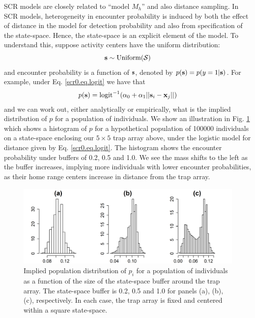 SCR models are closely related to  ``model
$M_h$'' and also distance sampling.  In SCR models,
heterogeneity in encounter probability is induced by both the effect
of distance in the model for detection probability and also from
specification of the state-space. Hence, the state-space  is an
explicit element of the model.
To understand this, suppose activity centers have the uniform distribution:
\[
{\bf s} \sim \mbox{Uniform}({\cal S})
\]
and encounter probability is a function of ${\bf s}$, denoted by
 $p({\bf s}) = p(y=1|{\bf s})$.
For example, under Eq. \ref{scr0.eq.logit}
we have that
\[
p({\bf s}) = \mbox{logit}^{-1} ( \alpha_{0} + \alpha_1 ||{\bf
  s}_{i}-{\bf x}_{j} || )
\]
and we can work out, either analytically or empirically, what is the
implied distribution of $p$ for a population of individuals.  We show
an illustration in Fig. \ref{scr0.fig.buffereffect} which shows a
histogram of $p$ for a hypothetical population of 100000 individuals
on a state-space enclosing our $5 \times 5$ trap array above, under
the logistic model for distance given by Eq. \ref{scr0.eq.logit}.
The
histogram shows the encounter probability under buffers of 0.2, 0.5
and 1.0. We see the mass shifts to the left as the buffer increases,
implying more individuals with lower encounter probabilities, as their
home range centers increase in distance from the trap array.

\begin{figure}[ht]
\begin{center}
\includegraphics[width=4.5in,height=1.6in]{Ch4-SCR0/figs/Mh_buffer}
\end{center}
\caption{Implied population distribution of $p_{i}$ for a population
  of individuals as a function of the size of the state-space buffer
around the trap array. The state-space buffer is 0.2, 0.5 and 1.0 for
panels (a), (b), (c), respectively.
In each case, the trap array is fixed and centered within a
  square state-space.
}
\label{scr0.fig.buffereffect}
\end{figure}

